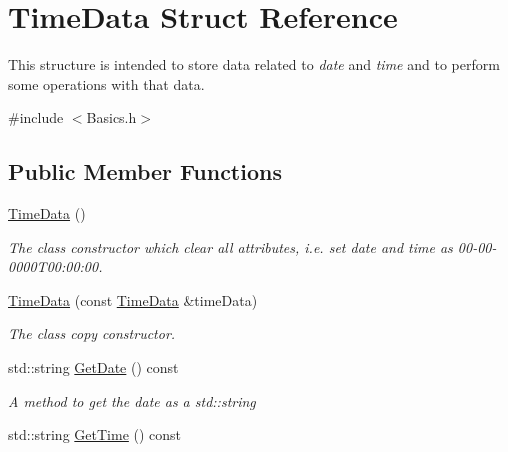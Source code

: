 \hypertarget{structTimeData}{}\section{Time\+Data Struct Reference}
\label{structTimeData}


This structure is intended to store data related to {\itshape date} and {\itshape time} and to perform some operations with that data.  




{\ttfamily \#include $<$Basics.\+h$>$}

\subsection*{Public Member Functions}
\begin{DoxyCompactItemize}
\item 
\mbox{\label{structTimeData_a4be51d0cd0dce3b91ce449b6c995a9e9}} 
\hyperlink{structTimeData_a4be51d0cd0dce3b91ce449b6c995a9e9}{Time\+Data} ()
\begin{DoxyCompactList}\small\item\em The class\textquotesingle{} constructor which clear all attributes, i.\+e. set date and time as 00-\/00-\/0000\+T00\+:00\+:00. \end{DoxyCompactList}\item 
\hyperlink{structTimeData_af0454b54d768d6b21267b3692dae4d3d}{Time\+Data} (const \hyperlink{structTimeData}{Time\+Data} \&time\+Data)
\begin{DoxyCompactList}\small\item\em The class\textquotesingle{} copy constructor. \end{DoxyCompactList}\item 
\mbox{\label{structTimeData_a78640fbf87e59255e08836b6779ec5c0}} 
std\+::string \hyperlink{structTimeData_a78640fbf87e59255e08836b6779ec5c0}{Get\+Date} () const
\begin{DoxyCompactList}\small\item\em A method to get the date as a {\ttfamily std\+::string} \end{DoxyCompactList}\item 
\mbox{\label{structTimeData_a6810621b9bd2289b697a7cd7b1799515}} 
std\+::string \hyperlink{structTimeData_a6810621b9bd2289b697a7cd7b1799515}{Get\+Time} () const

\end{DoxyCompactItemize}
